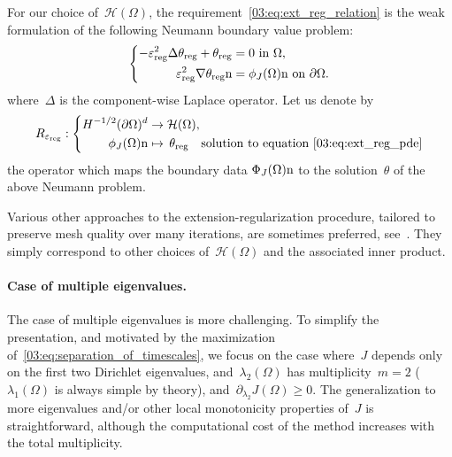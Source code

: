 For our choice of~$\mathcal H(\Omega)$, the requirement~\eqref{03:eq:ext_reg_relation} is the weak formulation of the following Neumann boundary value problem:
\begin{equation}
    \label{03:eq:ext_reg_pde}
    \left\{
        \begin{aligned}
            -\varepsilon_{\mathrm{reg}}^2\Delta \theta_{\mathrm{reg}} + \theta_{\mathrm{reg}} &= 0\text{ in }\Omega,\\
            \varepsilon_{\mathrm{reg}}^2\nabla\theta_{\mathrm{reg}}\mathrm{n} &= \phi_J(\Omega)\mathrm{n}\text{ on }\partial\Omega.
        \end{aligned}
    \right.
\end{equation}
where~$\Delta$ is the component-wise Laplace operator. Let us denote by
\begin{equation}
    \label{03:eq:ext_reg_op}
    R_{\varepsilon_{\mathrm{reg}}}:\left\{
    \begin{aligned}
        H^{-1/2}(\partial\Omega)^d &\to \mathcal H(\Omega),\\
        \phi_J(\Omega)\mathrm{n} &\mapsto\,\theta_{\mathrm{reg}} \quad \text{solution to equation~\eqref{03:eq:ext_reg_pde}}
    \end{aligned}
    \right.
\end{equation}
the operator which maps the boundary data $\Phi_J(\Omega)\mathrm{n}$ to the solution~$\theta$ of the above Neumann problem.

Various other approaches to the extension-regularization procedure, tailored to preserve mesh quality over many iterations, are sometimes preferred, see~\cite[Section 3.5]{DFOP18}. They simply correspond to other choices of~$\mathcal H(\Omega)$ and the associated inner product.

\paragraph{Case of multiple eigenvalues.}
The case of multiple eigenvalues is more challenging. To simplify the presentation, and motivated by the maximization of~\eqref{03:eq:separation_of_timescales}, we focus on the case where~$J$ depends only on the first two Dirichlet eigenvalues, and~$\lambda_2(\Omega)$ has multiplicity~$m = 2$ ($\lambda_1(\Omega)$ is always simple by theory), and~$\partial_{\lambda_2} J(\Omega)\geq 0$. The generalization to more eigenvalues and/or other local monotonicity properties of~$J$ is straightforward, although the computational cost of the method increases with the total multiplicity.

